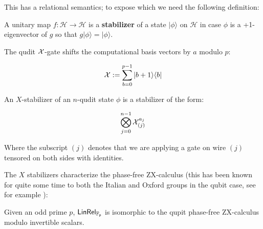 This has a relational semantics; to expose which we need the following definition:


\begin{definition}
A unitary map $f:\mathcal{H}\to \mathcal{H}$ is a {\bf stabilizer} of a state $|\phi\rangle$ on $\mathcal H$ in case $\phi$ is a +1-eigenvector of $g$ so that $g| \phi\rangle = |\phi \rangle$.


The qudit ${\cal X}$-gate  shifts the computational basis vectors by $a$ modulo $p$:

$${\cal X} := \sum_{b=0}^{p-1} | b+1\rangle \langle b|$$

An $X$-stabilizer of an $n$-qudit state $\phi$ is a stabilizer of the form:

$$
\bigotimes_{j=0}^{n-1}{\cal X}_{(j)}^{a_j}
$$

Where the subscript $(j)$ denotes that we are applying a gate on wire $(j)$ tensored on both sides with identities.


\end{definition}

The $X$ stabilizers characterize the phase-free ZX-calculus (this has been known for quite some time to both the Italian and Oxford groups in the qubit case, see for example \cite[p. 8]{ih}):

\begin{lemma}
Given an odd prime $p$, $\sf LinRel_{\mathbb{F}_p}$ is isomorphic to the qupit phase-free ZX-calculus modulo invertible scalars.
\end{lemma}

